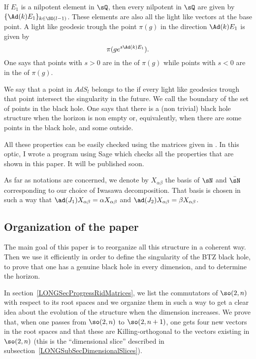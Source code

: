If $E_1$ is a nilpotent element in $\sQ$, then every nilpotent in $\sQ$ are given by $\{ \Ad(k)E_1 \}_{k\in\SO(l-1)}$. These elements are also all the light like vectors at the base point. A light like geodesic trough the point $\pi(g)$ in the direction $\Ad(k)E_1$ is given by
\begin{equation}
	\pi(g e^{s\Ad(k)E_1}).
\end{equation}
One says that  points with $s>0$ are in the  of $\pi(g)$ while points with $s<0$ are in the  of $\pi(g)$.

We say that a point in $AdS_l$ belongs to the  if every light like geodesics trough that point intersect the singularity in the future. We call  the boundary of the set of points in the black hole. One says that there is a (non trivial) black hole structure when the horizon is non empty or, equivalently, when there are some points in the black hole, and some outside.

All these properties can be easily checked using the matrices given in \cite{These,lcTNAdS}. In this optic, I wrote a program using Sage\cite{Sage} which checks all the properties that are shown in this paper. It will be published soon.

As far as notations are concerned, we denote by $X_{\alpha\beta}$ the basis of $\sN$ and $\bar\sN$ corresponding to our choice of Iwasawa decomposition. That basis is chosen in such a way that $\ad(J_1)X_{\alpha\beta}=\alpha X_{\alpha\beta}$ and $\ad(J_2)X_{\alpha\beta}=\beta X_{\alpha\beta}$.

%
\subsection{Organization of the paper}
%

The main goal of this paper is to reorganize all this structure in a coherent way. Then we use it efficiently in order to define the singularity of the BTZ black hole, to prove that one has a genuine black hole in every dimension, and to determine the horizon.

In section~\ref{LONGSecProgressRidMatrices}, we list the commutators of $\so(2,n)$ with respect to its root spaces and we organize them in such a way to get a clear idea about the evolution of the structure when the dimension increases. We prove that, when one passes from $\so(2,n)$ to $\so(2,n+1)$, one gets four new vectors in the root spaces and that these are Killing-orthogonal to the vectors existing in $\so(2,n)$ (this is the ``dimensional slice'' described in subsection~\ref{LONGSubSecDimensionalSlices}).

